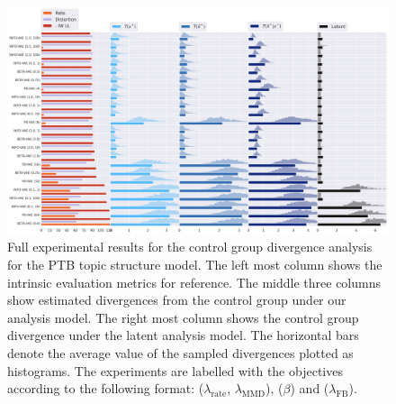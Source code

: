 \begin{figure}[!htb]
    \centering
    \includegraphics[width=\textwidth]{images/kl_plots/ptb_topics_selection_False.png}
    \caption{Full experimental results for the control group divergence analysis for the PTB topic structure model. The left most column shows the intrinsic evaluation metrics for reference. The middle three columns show estimated divergences from the control group under our analysis model. The right most column shows the control group divergence under the latent analysis model. The horizontal bars denote the average value of the sampled divergences plotted as histograms. The experiments are labelled with the objectives according to the following format: \infovae ($\lambda_{\text{rate}}$, $\lambda_{\text{MMD}}$), \betavae ($\beta$) and \fbvae ($\lambda_{\text{FB}}$). }
    \label{fig:kl-plot-ptb-topics}
\end{figure}
